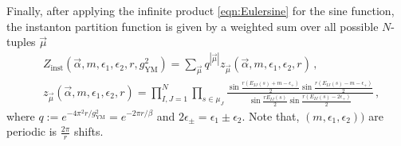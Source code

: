 \documentclass[main.tex]{subfiles}
\begin{document}
Finally, after applying the infinite product \eqref{eqn:Eulersine} for the sine function, the instanton partition function is given by a weighted sum over all possible $N$-tuples $\vec{\mu}$
\begin{align}
&Z_{\text{inst}}\left(\vec{\alpha},m,\epsilon_1,\epsilon_2,r,g^2_{\text{YM}}\right)=\sum_{\vec{\mu}} q^{|\vec{\mu}|}z_{\vec{\mu}}\left(\vec{\alpha},m,\epsilon_1,\epsilon_2,r\right)\,,\\
&z_{\vec{\mu}}\left(\vec{\alpha},m,\epsilon_1,\epsilon_2,r\right)=\prod_{I,J=1}^N\prod_{s\in\mu_J}\frac{\sin\frac{r\left(E_{IJ}(s)+m-\epsilon_+\right)}{2}\sin\frac{r\left(E_{IJ}(s)-m-\epsilon_+\right)}{2}}{\sin\frac{rE_{IJ}(s)}{2}\sin\frac{r\left(E_{IJ}(s)-2\epsilon_+\right)}{2}}\,,
\end{align}
where $q:=e^{-4\pi^2r/g^2_{\text{YM}}}=e^{-2\pi r/\beta}$ and $2\epsilon_{\pm}=\epsilon_1\pm\epsilon_2$. Note that, $(m,\epsilon_1,\epsilon_2))$ are periodic is $\frac{2\pi}{r}$ shifts.
\end{document}
